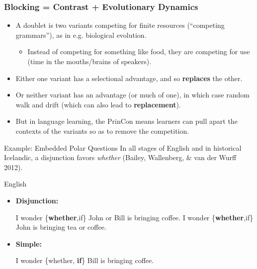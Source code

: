 \documentclass[hyperref={pdfpagelabels=false}]{beamer}
\begin{document}
\begin{frame}
\frametitle{Blocking = Contrast + Evolutionary Dynamics}
\begin{itemize}
	\item A doublet is two variants competing for finite resources (``competing grammars''), as in e.g. biological evolution.
		\begin{itemize} 
			\item Instead of competing for something like food, they are competing for use (time in the mouths/brains of speakers). 
			\end{itemize}
	\item Either one variant has a selectional advantage, and so \textbf{replaces} the other.
	\item Or neither variant has an advantage (or much of one), in which case random walk and drift (which can also lead to \textbf{replacement}).
	\item But in language learning, the PrinCon means learners can pull apart the contexts of the variants so as to remove the competition.
\end{itemize}
\end{frame}


\begin{frame}{Example: Embedded Polar Questions}
		In all stages of English and in historical Icelandic, a disjunction favors {\it whether} (Bailey, Wallenberg, \& van der Wurff 2012). \nocite{baileywallenbergwurff2012}
	\begin{block}{English}
		\begin{itemize}
		\item[ ]\textbf{Disjunction:}
		\begin{exe}
			\ex I wonder \{{\bf whether},if\} John or Bill is bringing coffee.
			\ex I wonder \{{\bf whether},if\} John is bringing tea or coffee.
		\end{exe}
		\item[ ]\textbf{Simple:}
		\begin{exe}
			\ex I wonder \{whether, {\bf if}\} Bill is bringing coffee.
		\end{exe}
		\end{itemize}
	
	\end{block}
\end{frame}
\end{document}
